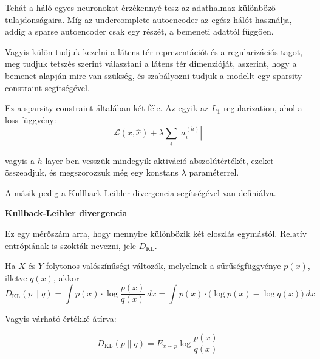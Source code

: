 \documentclass[12pt]{amsart}
\begin{document}
\vspace{5pt}

Tehát a háló egyes neuronokat érzékennyé tesz az adathalmaz
különböző tulajdonságaira. Míg az undercomplete autoencoder
az egész hálót használja, addig a sparse autoencoder csak
egy részét, a bemeneti adattól függően.

\vspace{5pt}

Vagyis külön tudjuk kezelni a látens tér reprezentációt és a
regularizációs tagot, meg tudjuk tetszés szerint választani
a látens tér dimenzióját, aszerint, hogy a bemenet alapján
mire van szükség, és szabályozni tudjuk a modellt egy
sparsity constraint segítségével.

\vspace{5pt}

Ez a sparsity constraint általában két féle. Az egyik az
$L_1$ regularization, ahol a loss függvény:
\[
  \mathcal{L}(x, \hat{x})+ \lambda \sum_{i}|a_i^{(h)}|
\]

\vspace{5pt}

vagyis a $h$ layer-ben vesszük mindegyik aktiváció
abszolútértékét, ezeket összeadjuk, és megszorozzuk még egy
konstans $\lambda$ paraméterrel.

\vspace{5pt}

A másik pedig a Kullback-Leibler divergencia segítségével
van definiálva.

\vspace{10pt}

\textbf{Kullback-Leibler divergencia}

\vspace{10pt}

Ez egy mérőszám arra, hogy mennyire különbözik két eloszlás
egymástól. Relatív entrópiának is szokták nevezni, jele
$D_{\text{KL}}$.

\vspace{5pt}

Ha $X$ és $Y$ folytonos valószínűségi változók, melyeknek a
sűrűségfüggvénye $p(x)$, illetve $q(x)$, akkor
\[
  D_{\text{KL}}(p \| q) = \int p(x)\cdot \log
  \frac{p(x)}{q(x)}\ dx = \int p(x)\cdot \big(\log p(x) - \log
  q(x)\big)\ dx
\]

\vspace{5pt}

Vagyis várható értékké átírva:

\[
  D_{\text{KL}}(p \| q) = E_{x\sim p} \log \frac{p(x)}{q(x)}
\]
\end{document}
